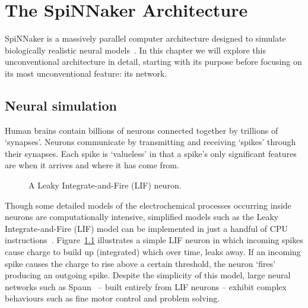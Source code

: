 \chapter{The SpiNNaker Architecture}
	
	\label{sec:background}
	
	SpiNNaker is a massively parallel computer architecture designed to simulate
	biologically realistic neural models~\cite{furber07}. In this chapter we will
	explore this unconventional architecture in detail, starting with its purpose
	before focusing on its most unconventional feature: its network.
	
	
	\section{Neural simulation}
		
		Human brains contain billions of neurons connected together by trillions of
		`synapses'. Neurons communicate by transmitting and receiving `spikes'
		through their synapses. Each spike is `valueless' in that a spike's only
		significant features are when it arrives and where it has come from.
		
		\begin{figure}
			\center
			
			\caption{A Leaky Integrate-and-Fire (LIF) neuron.}
			\label{fig:lif-neuron}
		\end{figure}
		
		Though some detailed models of the electrochemical processes occurring
		inside neurons are computationally intensive, simplified models such as the
		Leaky Integrate-and-Fire (LIF) model can be implemented in just a handful
		of CPU instructions~\cite{vainbrand11}. Figure~\ref{fig:lif-neuron}
		illustrates a simple LIF neuron in which incoming spikes cause charge to
		build up (integrated) which over time, leaks away. If an incoming spike
		causes the charge to rise above a certain threshold, the neuron `fires'
		producing an outgoing spike. Despite the simplicity of this model, large
		neural networks such as Spaun~\cite{eliasmith12} -- built entirely from LIF
		neurons -- exhibit complex behaviours such as fine motor control and
		problem solving.
		
